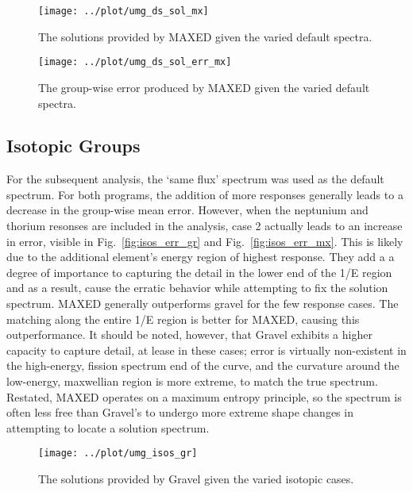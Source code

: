\documentclass[journal]{IEEEtran}
\newcommand{\FIG}[1]{Fig.~\ref{#1}}               %
\begin{document}
\begin{figure}[h!tb]
  \centering
  \texttt{[image: ../plot/umg\_ds\_sol\_mx]}
  \caption{The solutions provided by MAXED given the varied default spectra.}
  \label{fig:ds_sol_mx}
\end{figure}

\begin{figure}[h!tb]
  \centering
  \texttt{[image: ../plot/umg\_ds\_sol\_err\_mx]}
  \caption{The group-wise error produced by MAXED given the varied default spectra.}
  \label{fig:ds_err_mx}
\end{figure}


\subsection{Isotopic Groups}

For the subsequent analysis, the `same flux' spectrum was used as the default spectrum.
For both programs, the addition of more responses generally leads to a decrease in the group-wise mean error.
However, when the neptunium and thorium resonses are included in the analysis, case 2 actually leads to an increase in error, visible in \FIG{fig:isos_err_gr} and \FIG{fig:isos_err_mx}.
This is likely due to the additional element's energy region of highest response.
They add a a degree of importance to capturing the detail in the lower end of the 1/E region and as a result, cause the erratic behavior while attempting to fix the solution spectrum.
MAXED generally outperforms gravel for the few response cases.
The matching along the entire 1/E region is better for MAXED, causing this outperformance.
It should be noted, however, that Gravel exhibits a higher capacity to capture detail, at lease in these cases; error is virtually non-existent in the high-energy, fission spectrum end of the curve, and the curvature around the low-energy, maxwellian region is more extreme, to match the true spectrum.
Restated, MAXED operates on a maximum entropy principle, so the spectrum is often less free than Gravel's to undergo more extreme shape changes in attempting to locate a solution spectrum.



\begin{figure}[h!tb]
  \centering
  \texttt{[image: ../plot/umg\_isos\_gr]}
  \caption{The solutions provided by Gravel given the varied isotopic cases.}
  \label{fig:isos_gr}
\end{figure}
\end{document}
